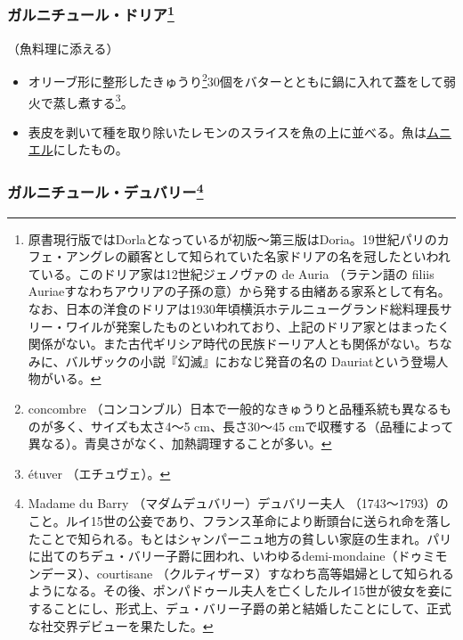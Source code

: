 \begin{recette}
\hypertarget{garniture-doria}{%
\subsubsection[ガルニチュール・ドリア]{\texorpdfstring{ガルニチュール・ドリア\footnote{原書現行版ではDorlaとなっているが初版〜第三版はDoria。19世紀パリのカフェ・アングレの顧客として知られていた名家ドリアの名を冠したといわれている。このドリア家は12世紀ジェノヴァの
  de Auria （ラテン語の filiis
  Auriaeすなわちアウリアの子孫の意）から発する由緒ある家系として有名。なお、日本の洋食のドリアは1930年頃横浜ホテルニューグランド総料理長サリー・ワイルが発案したものといわれており、上記のドリア家とはまったく関係がない。また古代ギリシア時代の民族ドーリア人とも関係がない。ちなみに、バルザックの小説『幻滅』におなじ発音の名の
  Dauriatという登場人物がいる。}}{ガルニチュール・ドリア}}\label{garniture-doria}}



（魚料理に添える）

\begin{itemize}
\item
  オリーブ形に整形したきゅうり\footnote{concombre
    （コンコンブル）日本で一般的なきゅうりと品種系統も異なるものが多く、サイズも太さ4〜5
    cm、長さ30〜45
    cmで収穫する（品種によって異なる）。青臭さがなく、加熱調理することが多い。}30個をバターとともに鍋に入れて蓋をして弱火で蒸し煮する\footnote{étuver
    （エチュヴェ）。}。
\item
  表皮を剥いて種を取り除いたレモンのスライスを魚の上に並べる。魚は\protect\hyperlink{meuniere}{ムニエル}にしたもの。
\end{itemize}

\hypertarget{garniture-dubarry}{%
\subsubsection[ガルニチュール・デュバリー]{\texorpdfstring{ガルニチュール・デュバリー\footnote{Madame
  du Barry （マダムデュバリー）デュバリー夫人
  （1743〜1793）のこと。ルイ15世の公妾であり、フランス革命により断頭台に送られ命を落したことで知られる。もとはシャンパーニュ地方の貧しい家庭の生まれ。パリに出てのちデュ・バリー子爵に囲われ、いわゆるdemi-mondaine（ドゥミモンデーヌ）、courtisane
  （クルティザーヌ）すなわち高等娼婦として知られるようになる。その後、ポンパドゥール夫人を亡くしたルイ15世が彼女を妾にすることにし、形式上、デュ・バリー子爵の弟と結婚したことにして、正式な社交界デビューを果たした。}}{ガルニチュール・デュバリー}}\label{garniture-dubarry}}


\end{recette}
